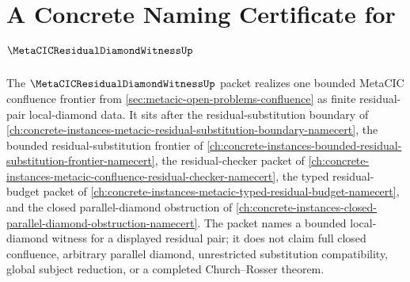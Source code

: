\chapter{A Concrete Naming Certificate for $\MetaCICResidualDiamondWitnessUp$}
\label{ch:concrete-instances-metacic-residual-diamond-witness-namecert}

The $\MetaCICResidualDiamondWitnessUp$ packet realizes one bounded MetaCIC confluence frontier from \autoref{sec:metacic-open-problems-confluence} as finite residual-pair local-diamond data. It sits after the residual-substitution boundary of \autoref{ch:concrete-instances-metacic-residual-substitution-boundary-namecert}, the bounded residual-substitution frontier of \autoref{ch:concrete-instances-bounded-residual-substitution-frontier-namecert}, the residual-checker packet of \autoref{ch:concrete-instances-metacic-confluence-residual-checker-namecert}, the typed residual-budget packet of \autoref{ch:concrete-instances-metacic-typed-residual-budget-namecert}, and the closed parallel-diamond obstruction of \autoref{ch:concrete-instances-closed-parallel-diamond-obstruction-namecert}. The packet names a bounded local-diamond witness for a displayed residual pair; it does not claim full closed confluence, arbitrary parallel diamond, unrestricted substitution compatibility, global subject reduction, or a completed Church--Rosser theorem.


